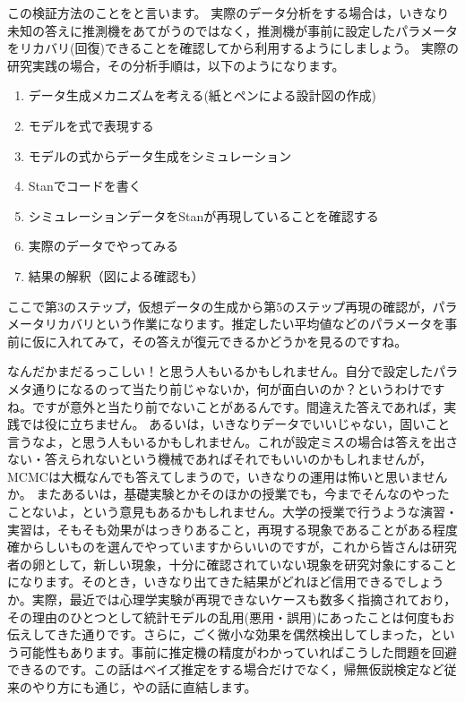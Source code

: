 \documentclass{ltjsbook}
\begin{document}
この検証方法のことをと言います。
実際のデータ分析をする場合は，いきなり未知の答えに推測機をあてがうのではなく，推測機が事前に設定したパラメータをリカバリ(回復)できることを確認してから利用するようにしましょう。
実際の研究実践の場合，その分析手順は，以下のようになります。
\begin{enumerate}
    \item データ生成メカニズムを考える(紙とペンによる設計図の作成)
    \item モデルを式で表現する
    \item モデルの式からデータ生成をシミュレーション
    \item Stanでコードを書く
    \item シミュレーションデータをStanが再現していることを確認する
    \item 実際のデータでやってみる
    \item 結果の解釈（図による確認も）
\end{enumerate}
ここで第3のステップ，仮想データの生成から第5のステップ再現の確認が，パラメータリカバリという作業になります。推定したい平均値などのパラメータを事前に仮に入れてみて，その答えが復元できるかどうかを見るのですね。

なんだかまだるっこしい！と思う人もいるかもしれません。自分で設定したパラメタ通りになるのって当たり前じゃないか，何が面白いのか？というわけですね。ですが意外と当たり前でないことがあるんです。間違えた答えであれば，実践では役に立ちません。
あるいは，いきなりデータでいいじゃない，固いこと言うなよ，と思う人もいるかもしれません。これが設定ミスの場合は答えを出さない・答えられないという機械であればそれでもいいのかもしれませんが，MCMCは大概なんでも答えてしまうので，いきなりの運用は怖いと思いませんか。
またあるいは，基礎実験とかそのほかの授業でも，今までそんなのやったことないよ，という意見もあるかもしれません。大学の授業で行うような演習・実習は，そもそも効果がはっきりあること，再現する現象であることがある程度確からしいものを選んでやっていますからいいのですが，これから皆さんは研究者の卵として，新しい現象，十分に確認されていない現象を研究対象にすることになります。そのとき，いきなり出てきた結果がどれほど信用できるでしょうか。実際，最近では心理学実験が再現できないケースも数多く指摘されており，その理由のひとつとして統計モデルの乱用(悪用・誤用)にあったことは何度もお伝えしてきた通りです。さらに，ごく微小な効果を偶然検出してしまった，という可能性もあります。事前に推定機の精度がわかっていればこうした問題を回避できるのです。この話はベイズ推定をする場合だけでなく，帰無仮説検定など従来のやり方にも通じ，やの話に直結します。
\end{document}
